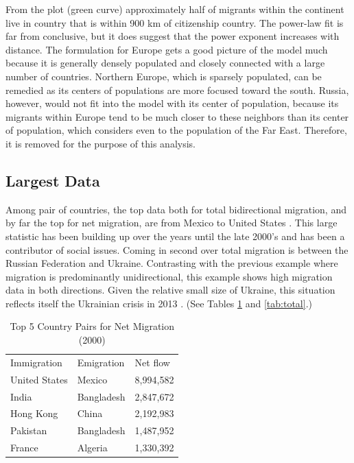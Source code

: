 \documentclass{acm_proc_article-sp}
\begin{document}
From the plot (green curve) approximately half of migrants within the continent live in country that is within 900 km of citizenship country. The power-law fit is far from conclusive, but it does suggest that the power exponent increases with distance. The formulation for Europe gets a good picture of the model much because it is generally densely populated and closely connected with a large number of countries. Northern Europe, which is sparsely populated, can be remedied as its centers of populations are more focused toward the south. Russia, however, would not fit into the model with its center of population, because its migrants within Europe tend to be much closer to these neighbors than its center of population, which considers even to the population of the Far East. Therefore, it is removed for the purpose of this analysis.

\subsection{Largest Data}

Among pair of countries, the top data both for total bidirectional migration, and by far the top for net migration, are from Mexico to United States \cite{mpi}. This large statistic has been building up over the years until the late 2000's and has been a contributor of social issues. Coming in second over total migration is between the Russian Federation and Ukraine. Contrasting with the previous example where migration is predominantly unidirectional, this example shows high migration data in both directions. Given the relative small size of Ukraine, this situation reflects itself the Ukrainian crisis in 2013  \cite{osw}. (See Tables \ref{tab:net} and \ref{tab:total}.)

\begin{table}[h]
\centering
\caption{Top 5 Country Pairs for Net Migration (2000)}
\begin{tabular}{|l|l|l|}
\cline{1-3}
Immigration   & Emigration & Net flow   \\ \cline{1-3}
United States & Mexico     & 8,994,582  \\ \cline{1-3}
India         & Bangladesh & 2,847,672  \\ \cline{1-3}
Hong Kong     & China      & 2,192,983  \\ \cline{1-3}
Pakistan      & Bangladesh & 1,487,952  \\ \cline{1-3}
France        & Algeria    & 1,330,392  \\ \cline{1-3}
\end{tabular}
\label{tab:net}
\end{table}
\end{document}
